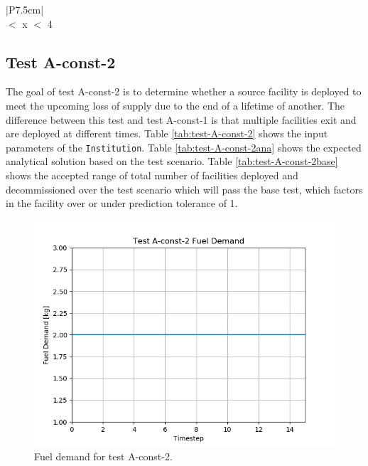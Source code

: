 \documentclass[11pt,letterpaper]{article}
\begin{document}
\begin{table}[H]
	\centering
	\caption{Test A-const-1 Base Test Acceptance}
	\label{tab:test-A-const-1base}
	\begin{tabular}{|P{7.5cm}|}
		\hline
		\textbf{}\\
		 $<$ x $<$ 4 \\
		\hline
	\end{tabular}
\end{table}

\subsection{Test A-const-2}
The goal of test A-const-2 is to determine whether a source facility is deployed
to meet the upcoming loss of supply due to the end of a lifetime of another.
The difference between this test and test A-const-1 is that multiple facilities
exit and are deployed at different times.
Table \ref{tab:test-A-const-2} shows the input parameters of the \texttt{Institution}. Table \ref{tab:test-A-const-2ana} shows the expected analytical solution based on the test scenario. Table \ref{tab:test-A-const-2base} shows the accepted range of total number of facilities deployed and decommissioned over the test scenario which will pass the base test, which factors in the facility over or under prediction tolerance of 1.

\begin{figure}[H]
	\begin{center}
		\includegraphics[scale=0.7]{./images/A-const-2.png}
	\end{center}
        \caption{Fuel demand for test A-const-2.}
	\label{fig:A-dep-2}
\end{figure}
\end{document}
